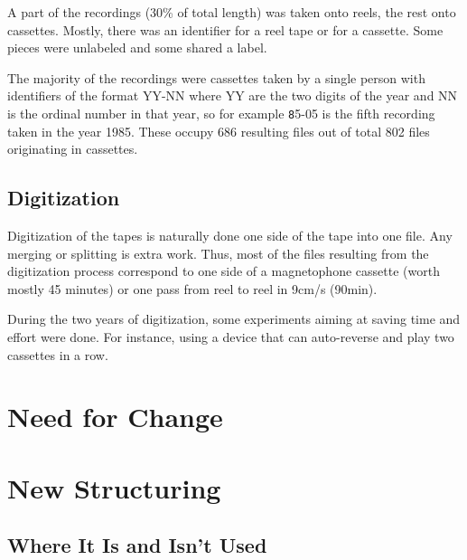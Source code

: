 A part of the recordings (30\% of total length) was taken onto reels, the rest
onto cassettes. Mostly, there was an identifier for a reel tape or for a
cassette. Some pieces were unlabeled and some shared a label.

The majority of the recordings were cassettes taken by a single person with
identifiers of the format YY-NN where YY are the two digits of the year and NN
is the ordinal number in that year, so for example {\texttt 85-05} is the fifth
recording taken in the year 1985. These occupy 686 resulting files out of
total 802 files originating in cassettes.

\subsection{Digitization}

Digitization of the tapes is naturally done one side of the tape into one file.
Any merging or splitting is extra work. Thus, most of the files resulting from
the digitization process correspond to one side of a magnetophone cassette
(worth mostly 45 minutes) or one pass from reel to reel in 9cm/s (90min).

During the two years of digitization, some experiments aiming at saving time and
effort were done. For instance, using a device that can auto-reverse and play
two cassettes in a row.

\section{Need for Change}

\section{New Structuring}

\subsection{Where It Is and Isn't Used}

\subsection{}


